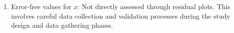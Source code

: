 \documentclass[11pt]{article}
\begin{document}
\begin{enumerate}
    \item Error-free values for $x$: Not directly assessed through residual plots. This involves careful data collection and validation processes during the study design and data gathering phases.
\end{enumerate}



% 
% 
\end{document}
